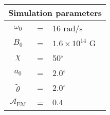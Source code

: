 \begin{tabular}{ccl}
\multicolumn{3}{c}{Simulation parameters} \\
\hline
$\omega_0$  &=& 16 rad/s\\
$B_0$  &=& ${1.6}\times 10^{14}$ G \\
$\chi$  &=& 50$^{\circ}$ \\
$a_0$ &=& 2.0$^{\circ}$ \\
$\tilde{\theta}$ &= & 2.0$^{\circ}$ \\
$\mathcal{A}_{\mathrm{EM}}$ &= & $0.4$
\end{tabular}
